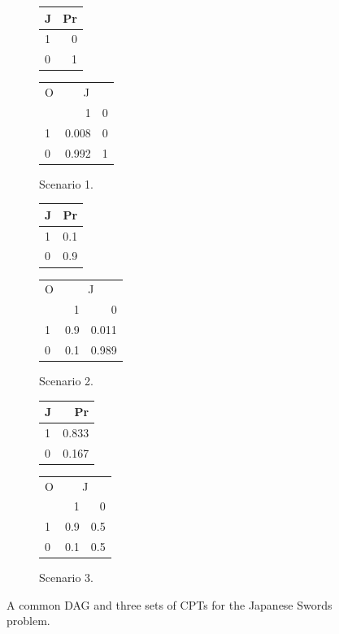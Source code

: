 \documentclass[
  10pt,
]{scrartcl}
\begin{document}
\begin{figure}[H]
\begin{subfigure}[!ht]{0.2\textwidth}
\begin{tabular}{lr}
\toprule
J & Pr\\
\midrule
1 & 0\\
0 & 1\\
\bottomrule
\end{tabular}


\begin{tabular}{lrr}
\toprule
\multicolumn{1}{c}{O} & \multicolumn{2}{c}{J} \\
  & 1 & 0\\
\midrule
1 & 0.008 & 0\\
0 & 0.992 & 1\\
\bottomrule
\end{tabular}
\caption{Scenario 1.}
\end{subfigure} 
\begin{subfigure}[!ht]{0.2\textwidth}

\begin{tabular}{lr}
\toprule
J & Pr\\
\midrule
1 & 0.1\\
0 & 0.9\\
\bottomrule
\end{tabular}


\begin{tabular}{lrr}
\toprule
\multicolumn{1}{c}{O} & \multicolumn{2}{c}{J} \\
  & 1 & 0\\
\midrule
1 & 0.9 & 0.011\\
0 & 0.1 & 0.989\\
\bottomrule
\end{tabular}
\caption{Scenario 2.}
\end{subfigure}  \hfill
\begin{subfigure}[!ht]{0.2\textwidth}

\begin{tabular}{lr}
\toprule
J & Pr\\
\midrule
1 & 0.833\\
0 & 0.167\\
\bottomrule
\end{tabular}


\begin{tabular}{lrr}
\toprule
\multicolumn{1}{c}{O} & \multicolumn{2}{c}{J} \\
  & 1 & 0\\
\midrule
1 & 0.9 & 0.5\\
0 & 0.1 & 0.5\\
\bottomrule
\end{tabular}
\caption{Scenario 3.}
\end{subfigure} 
\caption{A common DAG and three sets of CPTs for the \textsf{Japanese Swords} problem.}
\label{fig:japanese}
\end{figure}
\end{document}
